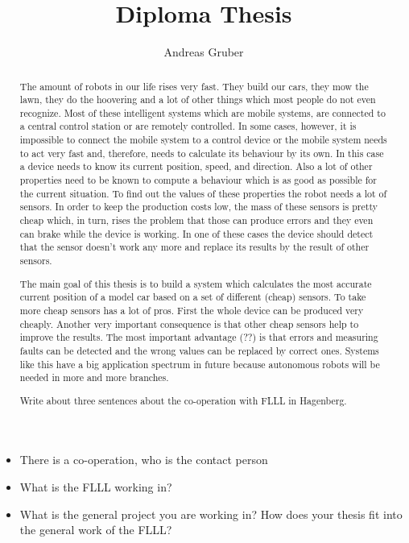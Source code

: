 \documentclass[english, 10pt]{report}
\begin{document}
\title{Diploma Thesis}


\author{Andreas Gruber}
\maketitle
\begin{abstract}
The amount of robots in our life rises very fast. They build our cars,
they mow the lawn, they do the hoovering and a lot of other things
which most people do not even recognize. Most of these intelligent
systems which are mobile systems, are connected to a central control
station or are remotely controlled. In some cases, however, it is
impossible to connect the mobile system to a control device or the
mobile system needs to act very fast and, therefore, needs to calculate
its behaviour by its own. In this case a device needs to know  its
current position, speed, and direction. Also a lot of other properties
need to be known to compute a behaviour which is as good as possible
for the current situation. To find out the values of these properties
the robot needs a lot of sensors. In order to keep the production
costs low, the mass of these sensors is pretty cheap which, in turn,
rises the problem that those can produce errors and they even can
brake while the device is working. In one of these cases the device
should detect that the sensor doesn't work any more and replace its
results by the result of other sensors.

The main goal of this thesis is to build a system which calculates the
most accurate current position of a model car based on a set of different
(cheap) sensors. To take more cheap sensors
has a lot of pros. First the whole device can be produced very cheaply.
Another very important consequence is that other cheap sensors help
to improve the results. The most important advantage (??) is that
errors and measuring faults can be detected and the wrong values can
be replaced by correct ones. Systems like this have a big application
spectrum in future because autonomous robots will be needed in more
and more branches.

Write about three sentences about the co-operation with FLLL in Hagenberg.\end{abstract}
\begin{itemize}
\item There is a co-operation, who is the contact person
\item What is the FLLL working in?
\item What is the general project you are working in? How does your thesis
fit into the general work of the FLLL?\end{itemize}
\end{document}
